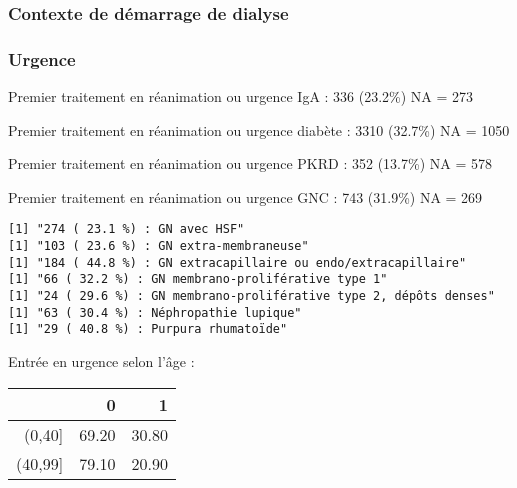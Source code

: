 \documentclass[11pt,a4paper]{article}\usepackage[]{graphicx}\usepackage[]{color}
\makeatletter
\newenvironment{kframe}{%
 \def\at@end@of@kframe{}%
 \ifinner\ifhmode%
  \def\at@end@of@kframe{\end{minipage}}%
  \begin{minipage}{\columnwidth}%
 \fi\fi%
 \def\FrameCommand##1{\hskip\@totalleftmargin \hskip-\fboxsep
 \colorbox{shadecolor}{##1}\hskip-\fboxsep
     \hskip-\linewidth \hskip-\@totalleftmargin \hskip\columnwidth}%
 \MakeFramed {\advance\hsize-\width
   \@totalleftmargin\z@ \linewidth\hsize
   \@setminipage}}%
 {\par\unskip\endMakeFramed%
 \at@end@of@kframe}
\newenvironment{knitrout}{}{} %
\makeatother
\begin{document}




    \subsubsection{Contexte de démarrage de dialyse}

  \subsubsection*{Urgence}


    
Premier traitement en réanimation ou urgence IgA :  336 (23.2\%) NA = 273

Premier traitement en réanimation ou urgence diabète :  3310 (32.7\%) NA = 1050

Premier traitement en réanimation ou urgence PKRD :  352 (13.7\%) NA = 578

Premier traitement en réanimation ou urgence GNC :  743 (31.9\%) NA = 269

\begin{knitrout}
\color{fgcolor}\begin{kframe}
\begin{verbatim}
[1] "274 ( 23.1 %) : GN avec HSF"
[1] "103 ( 23.6 %) : GN extra-membraneuse"
[1] "184 ( 44.8 %) : GN extracapillaire ou endo/extracapillaire"
[1] "66 ( 32.2 %) : GN membrano-proliférative type 1"
[1] "24 ( 29.6 %) : GN membrano-proliférative type 2, dépôts denses"
[1] "63 ( 30.4 %) : Néphropathie lupique"
[1] "29 ( 40.8 %) : Purpura rhumatoïde"
\end{verbatim}
\end{kframe}
\end{knitrout}

Entrée en urgence selon l'âge :

\begin{table}[H]
\centering
\begin{tabular}{rrr}
  \hline
 & 0 & 1 \\ 
  \hline
(0,40] & 69.20 & 30.80 \\ 
  (40,99] & 79.10 & 20.90 \\ 
   \hline
\end{tabular}
\end{table}
\end{document}
